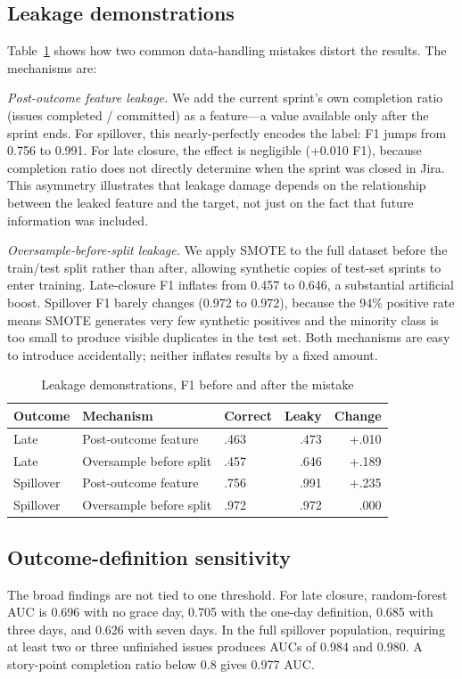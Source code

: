 \documentclass[conference]{IEEEtran}
\begin{document}
\subsection{Leakage demonstrations}
\label{sec:leakage}

Table~\ref{tab:leak} shows how two common data-handling mistakes distort the results.
The mechanisms are:

\emph{Post-outcome feature leakage.}
We add the current sprint's own completion ratio (issues completed / committed) as a feature---a value available only after the sprint ends.
For spillover, this nearly-perfectly encodes the label: F1 jumps from 0.756 to 0.991.
For late closure, the effect is negligible (+0.010 F1), because completion ratio does not directly determine when the sprint was closed in Jira.
This asymmetry illustrates that leakage damage depends on the relationship between the leaked feature and the target, not just on the fact that future information was included.

\emph{Oversample-before-split leakage.}
We apply SMOTE to the full dataset before the train/test split rather than after, allowing synthetic copies of test-set sprints to enter training.
Late-closure F1 inflates from 0.457 to 0.646, a substantial artificial boost.
Spillover F1 barely changes (0.972 to 0.972), because the 94\% positive rate means SMOTE generates very few synthetic positives and the minority class is too small to produce visible duplicates in the test set.
Both mechanisms are easy to introduce accidentally; neither inflates results by a fixed amount.

\begin{table}[!htb]
\centering\scriptsize
\caption{Leakage demonstrations, F1 before and after the mistake}
\label{tab:leak}
\setlength{\tabcolsep}{2.6pt}
\begin{tabular}{@{}lllrr@{}}
\toprule
Outcome & Mechanism & Correct & Leaky & Change\\
\midrule
Late & Post-outcome feature & .463 & .473 & +.010\\
Late & Oversample before split & .457 & .646 & +.189\\
Spillover & Post-outcome feature & .756 & .991 & +.235\\
Spillover & Oversample before split & .972 & .972 & .000\\
\bottomrule
\end{tabular}
\end{table}

\subsection{Outcome-definition sensitivity}
The broad findings are not tied to one threshold.
For late closure, random-forest AUC is 0.696 with no grace day, 0.705 with the one-day definition, 0.685 with three days, and 0.626 with seven days.
In the full spillover population, requiring at least two or three unfinished issues produces AUCs of 0.984 and 0.980.
A story-point completion ratio below 0.8 gives 0.977 AUC.
\end{document}
